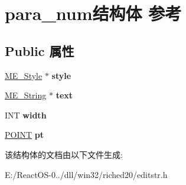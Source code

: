 \hypertarget{structpara__num}{}\section{para\+\_\+num结构体 参考}
\label{structpara__num}
\subsection*{Public 属性}
\begin{DoxyCompactItemize}
\item 
\mbox{\label{structpara__num_a381cec816d150cea9389ef39506ab834}} 
\hyperlink{structtag_m_e___style}{M\+E\+\_\+\+Style} $\ast$ {\bfseries style}
\item 
\mbox{\label{structpara__num_a5cd1ed1ed4ce16c7de6ac4dee0911ca6}} 
\hyperlink{structtag_m_e___string}{M\+E\+\_\+\+String} $\ast$ {\bfseries text}
\item 
\mbox{\label{structpara__num_a8cab038c2fecd11b4d6c88769e0d24b0}} 
I\+NT {\bfseries width}
\item 
\mbox{\label{structpara__num_a365b40fbdbebcff5f6c4eb0b4eb10e1e}} 
\hyperlink{structtag_p_o_i_n_t}{P\+O\+I\+NT} {\bfseries pt}
\end{DoxyCompactItemize}


该结构体的文档由以下文件生成\+:\begin{DoxyCompactItemize}
\item 
E\+:/\+React\+O\+S-\/0../dll/win32/riched20/editstr.\+h\end{DoxyCompactItemize}
